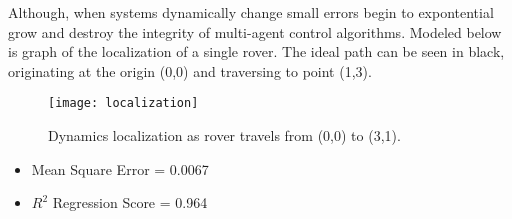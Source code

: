 Although, when systems dynamically change small errors begin to expontential grow and destroy the integrity of multi-agent control algorithms. 
Modeled below is graph of the localization of a single rover. The ideal path can be seen in black, originating at the origin (0,0) and traversing to point (1,3). 

\begin{figure} 
	\centering
	\texttt{[image: localization]}
	\caption{Dynamics localization as rover travels from (0,0) to (3,1).}
	\label{fig:dynamic}
\end{figure}


\begin{itemize}
	\item Mean Square Error = 0.0067 
	\item $R^2$ Regression Score = 0.964 
\end{itemize}



